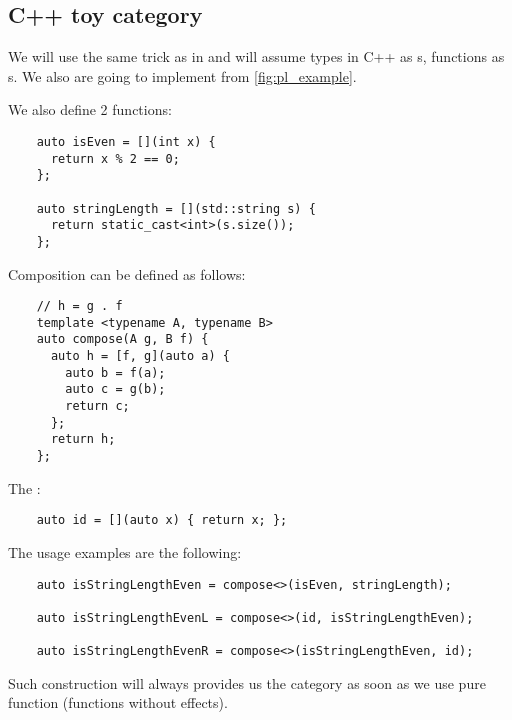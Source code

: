 \subsection{\textbf{C++} toy category}
\begin{example}
  \label{ex:cppcategory}
  We will use the same trick as in  and
  will assume 
  types in C++ as s, 
  functions as s.
  We also are going to implement
   from \cref{fig:pl_example}.


  We  also define 2 functions:
  \begin{verbatim}
    auto isEven = [](int x) { 
      return x % 2 == 0; 
    };

    auto stringLength = [](std::string s) { 
      return static_cast<int>(s.size()); 
    };
  \end{verbatim}

  Composition can be defined as follows:
  \begin{verbatim}
    // h = g . f
    template <typename A, typename B> 
    auto compose(A g, B f) {
      auto h = [f, g](auto a) {
        auto b = f(a);
        auto c = g(b);
        return c;
      };
      return h;
    };
  \end{verbatim}

  The :
  \begin{verbatim}
    auto id = [](auto x) { return x; };
  \end{verbatim}

  The usage examples are the following:
  \begin{verbatim}
    auto isStringLengthEven = compose<>(isEven, stringLength);

    auto isStringLengthEvenL = compose<>(id, isStringLengthEven);

    auto isStringLengthEvenR = compose<>(isStringLengthEven, id);  
  \end{verbatim}

  Such construction will always provides us the category as soon as we
  use pure function (functions without effects).
\end{example}

